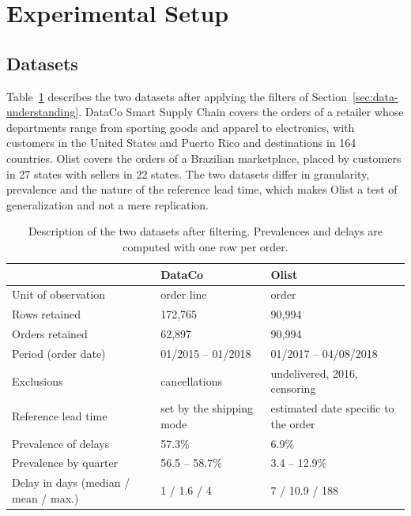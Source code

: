 \documentclass[11pt,a4paper]{article}
\theoremstyle{definition}
\begin{document}
\section{Experimental Setup}
\label{sec:design}

\subsection{Datasets}
\label{sec:datasets}

Table~\ref{tab:donnees} describes the two datasets after applying the filters of Section~\ref{sec:data-understanding}. DataCo Smart Supply Chain \cite{constante2019dataco} covers the orders of a retailer whose departments range from sporting goods and apparel to electronics, with customers in the United States and Puerto Rico and destinations in 164 countries. Olist \cite{olist2018brazilian} covers the orders of a Brazilian marketplace, placed by customers in 27 states with sellers in 22 states. The two datasets differ in granularity, prevalence and the nature of the reference lead time, which makes Olist a test of generalization and not a mere replication.

\begin{table}[!htbp]
\centering
\footnotesize
\caption{Description of the two datasets after filtering. Prevalences and delays are computed with one row per order.}
\label{tab:donnees}
\begin{tabular}{@{}lll@{}}
\toprule
 & DataCo & Olist \\
\midrule
Unit of observation & order line & order \\
Rows retained & 172{,}765 & 90{,}994 \\
Orders retained & 62{,}897 & 90{,}994 \\
Period (order date) & 01/2015 -- 01/2018 & 01/2017 -- 04/08/2018 \\
Exclusions & cancellations & undelivered, 2016, censoring \\
Reference lead time & set by the shipping mode & estimated date specific to the order \\
Prevalence of delays & 57.3\% & 6.9\% \\
Prevalence by quarter & 56.5 -- 58.7\% & 3.4 -- 12.9\% \\
Delay in days (median / mean / max.) & 1 / 1.6 / 4 & 7 / 10.9 / 188 \\
\bottomrule
\end{tabular}
\end{table}
\end{document}
